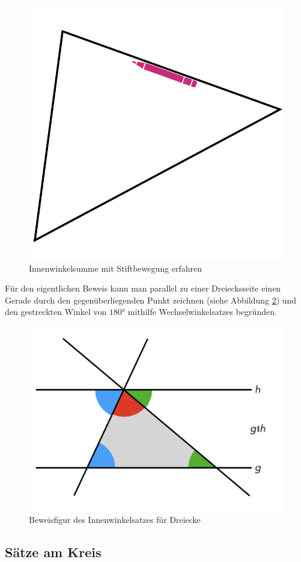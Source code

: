 \documentclass[
  ngerman,
]{scrbook}
\theoremstyle{definition}
\theoremstyle{definition}
\theoremstyle{definition}
\theoremstyle{definition}
\theoremstyle{remark}
\begin{document}
\begin{figure}

{\centering \includegraphics[width=0.5\linewidth]{pictures/C-InnenwinkelStift} 

}

\caption{Innenwinkelsumme mit Stiftbewegung erfahren}\label{fig:InnenwinkelStift}
\end{figure}

Für den eigentlichen Beweis kann man parallel zu einer Dreiecksseite einen Gerade durch den gegenüberliegenden Punkt zeichnen (siehe Abbildung \ref{fig:InnenwinkelBeweisfigure}) und den gestreckten Winkel von \(180°\) mithilfe Wechselwinkelsatzes begründen.

\begin{figure}

{\centering \includegraphics[width=0.75\linewidth]{pictures/C-InnenwinkelBeweisfigur} 

}

\caption{Beweisfigur des Innenwinkelsatzes für Dreiecke}\label{fig:InnenwinkelBeweisfigure}
\end{figure}

\hypertarget{suxe4tze-am-kreis}{%
\subsection{Sätze am Kreis}\label{suxe4tze-am-kreis}}
\end{document}
